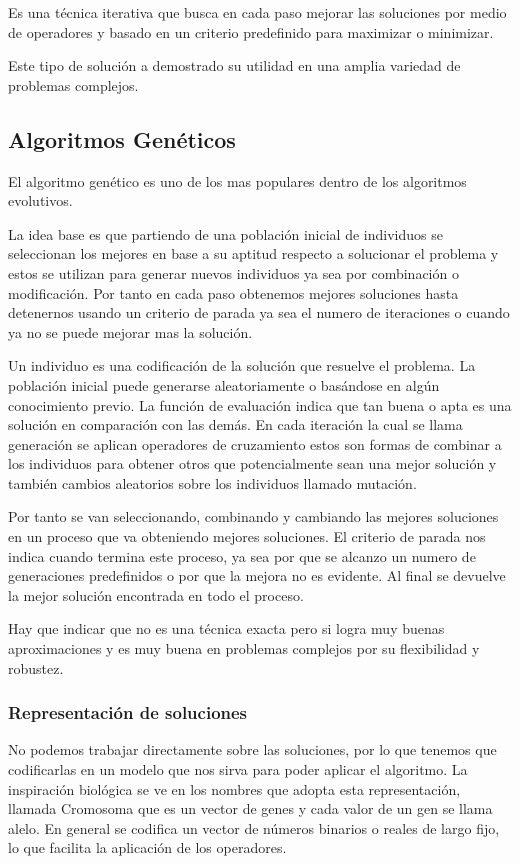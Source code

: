 Es una técnica iterativa que busca en cada paso mejorar las soluciones por medio de operadores y basado en un criterio predefinido para maximizar o minimizar.

Este tipo de solución a demostrado su utilidad en una amplia variedad de problemas complejos.


\subsection{Algoritmos Genéticos}
El algoritmo genético es uno de los mas populares dentro de los algoritmos evolutivos.

La idea base es que partiendo de una población inicial de individuos se seleccionan los mejores en base a su aptitud respecto a solucionar el problema y estos se utilizan para generar nuevos individuos ya sea por combinación o modificación. Por tanto en cada paso obtenemos mejores soluciones hasta detenernos usando un criterio de parada ya sea el numero de iteraciones o cuando ya no se puede mejorar mas la solución.

Un individuo es una codificación de la solución que resuelve el problema.
La población inicial puede generarse aleatoriamente o basándose en algún conocimiento previo.
La función de evaluación indica que tan buena o apta es una solución en comparación con las demás.
En cada iteración la cual se llama generación se aplican operadores de cruzamiento estos son formas de combinar a los individuos para obtener otros que potencialmente sean una mejor solución y también cambios aleatorios sobre los individuos llamado mutación.

Por tanto se van seleccionando, combinando y cambiando las mejores soluciones en un proceso que va obteniendo mejores soluciones.
El criterio de parada nos indica cuando termina este proceso, ya sea por que se alcanzo un numero de generaciones predefinidos o por que la mejora no es evidente. Al final se devuelve la mejor solución encontrada en todo el proceso.

Hay que indicar que no es una técnica exacta pero si logra muy buenas aproximaciones y es muy buena en problemas complejos por su flexibilidad y robustez. 


\subsubsection{Representación de soluciones}
No podemos trabajar directamente sobre las soluciones, por lo que tenemos que codificarlas en un modelo que nos sirva para poder aplicar el algoritmo.
La inspiración biológica se ve en los nombres que adopta esta representación, llamada Cromosoma que es un vector de genes y cada valor de un gen se llama alelo.
En general se codifica un vector de números binarios o reales de largo fijo, lo que facilita la aplicación de los operadores.

